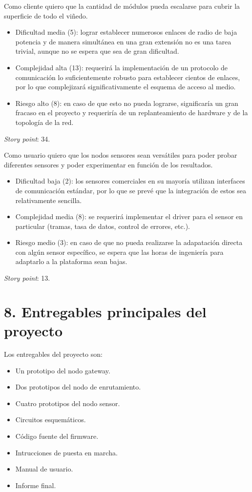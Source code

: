 \documentclass[
11pt, %
codirector, %
]{charter}
\begin{document}
Como cliente quiero que la cantidad de módulos pueda escalarse para cubrir la superficie de todo el viñedo.
\begin{itemize}
\item Dificultad media (5): lograr establecer numerosos enlaces de radio de baja potencia y de manera simultánea en una gran extensión no es una tarea trivial, aunque no se espera que sea de gran dificultad. 
\item Complejidad alta (13): requerirá la implementación de un protocolo de comunicación lo suficientemente robusto para establecer cientos de enlaces, por lo que complejizará significativamente el esquema de acceso al medio.
\item Riesgo alto (8): en caso de que esto no pueda lograrse, significaría un gran fracaso en el proyecto y requeriría de un replanteamiento de hardware y de la topología de la red.
\end{itemize}
\textit{Story point}: 34.

Como usuario quiero que los nodos sensores sean versátiles para poder probar diferentes sensores y poder experimentar en función de los resultados.
\begin{itemize}
\item Dificultad baja (2): los sensores comerciales en su mayoría utilizan interfaces de comunicación estándar, por lo que se prevé que la integración de estos sea relativamente sencilla.
\item Complejidad media (8): se requerirá implementar el driver para el sensor en particular (tramas, tasa de datos, control de errores, etc.).
\item Riesgo medio (3): en caso de que no pueda realizarse la adapatación directa con algún sensor específico, se espera que las horas de ingeniería para adaptarlo a la plataforma sean bajas.
\end{itemize}
\textit{Story point}: 13.

\section{8. Entregables principales del proyecto}
\label{sec:entregables}

Los entregables del proyecto son:

\begin{itemize}
	\item Un prototipo del nodo gateway.
	\item Dos prototipos del nodo de enrutamiento.
	\item Cuatro prototipos del nodo sensor.
	\item Circuitos esquemáticos.
	\item Código fuente del firmware.
	\item Intrucciones de puesta en marcha.
	\item Manual de usuario.
	\item Informe final.
\end{itemize}
\end{document}
